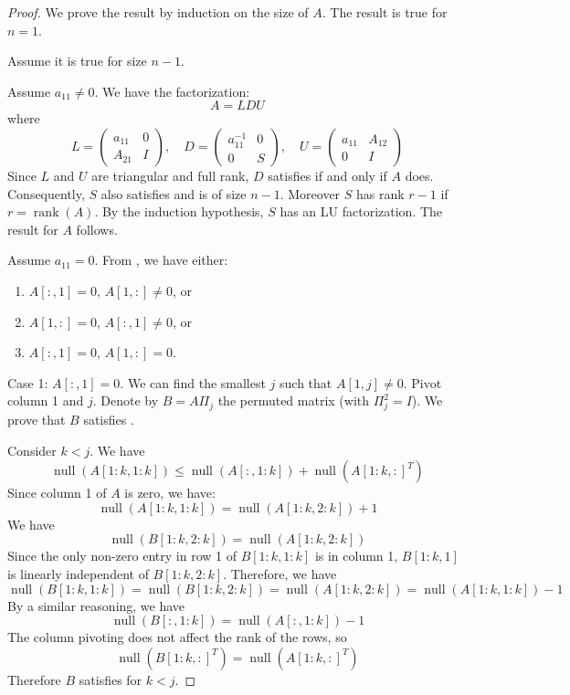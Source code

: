 \documentclass{article}
\DeclareMathOperator{\rk}{rank}
\DeclareMathOperator{\nl}{null}
\begin{document}
\begin{proof}
    We prove the result by induction on the size of $A$. The result is true for $n=1$.

    Assume it is true for size $n-1$.

    Assume $a_{11} \neq 0$. We have the factorization:
    \[
        A = LDU
    \]
    where
    \[
        L = \begin{pmatrix}
            a_{11} & 0 \\
            A_{21} & I
        \end{pmatrix}, \quad
        D = \begin{pmatrix}
            a_{11}^{-1} & 0 \\
            0           & S
        \end{pmatrix}, \quad
        U = \begin{pmatrix}
            a_{11} & A_{12} \\
            0      & I
        \end{pmatrix}
    \]
    Since $L$ and $U$ are triangular and full rank, $D$ satisfies  if and only if $A$ does. Consequently, $S$ also satisfies  and is of size $n-1$. Moreover $S$ has rank $r-1$ if $r = \rk(A)$. By the induction hypothesis, $S$ has an LU factorization. The result for $A$ follows.

    Assume $a_{11} = 0$. From , we have either:
    \begin{enumerate}
        \item $A[:,1] = 0$, $A[1,:] \ne 0$, or
        \item $A[1,:] = 0$, $A[:,1] \ne 0$, or
        \item $A[:,1] = 0$, $A[1,:] = 0$.
    \end{enumerate}

    Case 1: $A[:,1] = 0$. We can find the smallest $j$ such that $A[1,j] \neq 0$. Pivot column 1 and $j$. Denote by $B = A \Pi_j$ the permuted matrix (with $\Pi_j^2 = I$). We prove that $B$ satisfies .

    Consider $k < j$. We have
    \begin{equation} \label{eq:1}
        \nl(A[1:k,1:k]) \le \nl(A[:,1:k]) + \nl({A[1:k,:]}^T)
    \end{equation}
    Since column 1 of $A$ is zero, we have:
    \[
        \nl(A[1:k,1:k]) = \nl(A[1:k,2:k]) + 1
    \]
    We have
    \[
        \nl(B[1:k,2:k]) = \nl(A[1:k,2:k])
    \]
    Since the only non-zero entry in row 1 of $B[1:k,1:k]$ is in column 1, $B[1:k,1]$ is linearly independent of $B[1:k,2:k]$. Therefore, we have
    \[
        \nl(B[1:k,1:k]) = \nl(B[1:k,2:k]) = \nl(A[1:k,2:k]) = \nl(A[1:k,1:k]) - 1
    \]
    By a similar reasoning, we have
    \[
        \nl(B[:,1:k]) = \nl(A[:,1:k]) - 1
    \]
    The column pivoting does not affect the rank of the rows, so
    \[
        \nl({B[1:k,:]}^T) = \nl({A[1:k,:]}^T)
    \]
    Therefore $B$ satisfies  for $k < j$.


\end{proof}
\end{document}
